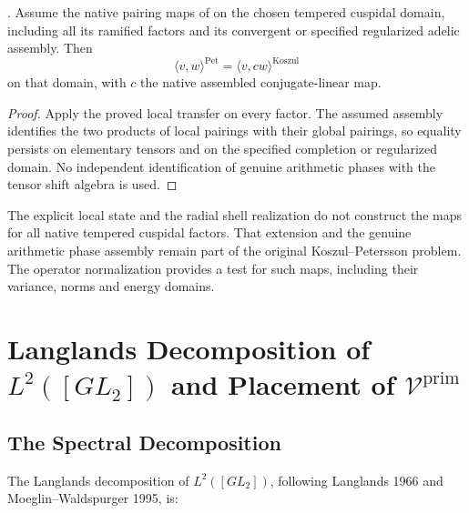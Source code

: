 \begin{theorem}
\label{v4-arith:kms-gns:thm:ramified-cuspidal-tempered-extension}
\ClaimStatusProvedHereConditional. Assume the native pairing
maps of  on the
chosen tempered cuspidal domain, including all its ramified
factors and its convergent or specified regularized adelic
assembly. Then
\begin{equation}
 \langle v,w\rangle^{\mathrm{Pet}}
    =\langle v,cw\rangle^{\mathrm{Koszul}}
 \label{v4-arith:kms-gns:eq:ramified-cuspidal-match}
\end{equation}
on that domain, with $c$ the native assembled conjugate-linear map.
\end{theorem}
\begin{proof}
Apply the proved local transfer on every factor. The assumed
assembly identifies the two products of local pairings with their
global pairings, so equality persists on elementary tensors and
on the specified completion or regularized domain. No independent
identification of genuine arithmetic phases with the tensor shift
algebra is used.
\end{proof}

\begin{remark}
\label{v4-arith:kms-gns:rem:w3-tightening}
The explicit local state and the radial shell realization do not
construct the maps for all native tempered cuspidal factors.
That extension and the genuine arithmetic phase assembly remain
part of the original Koszul--Petersson problem. The operator
normalization provides a test for such maps, including their
variance, norms and energy domains.
\end{remark}

\section{Langlands Decomposition of \(L^{2}([GL_{2}])\) and Placement of \(\mathcal{V}^{\mathrm{prim}}\)}
\label{v4-arith:kms-gns:cycle3}

\subsection{The Spectral Decomposition}
\label{v4-arith:kms-gns:cycle3:spectral}

The Langlands decomposition of \(L^{2}([GL_{2}])\), following
Langlands 1966 and Moeglin--Waldspurger 1995, is:


